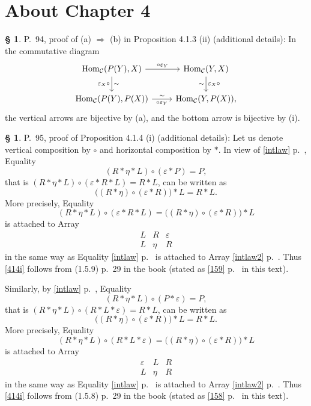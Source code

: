 \documentclass[12pt]{article}
\theoremstyle{remark}
\theoremstyle{definition}
\newtheorem{s}[thm]{\S}
\newcommand{\C}{\mathcal C}
\newcommand{\then}{\Rightarrow}
\DeclareMathOperator{\Hom}{Hom}%
\begin{document}
\section{About Chapter 4}
%
%
\begin{s} 
P.~94, proof of (a) $\then$ (b) in Proposition 4.1.3 (ii) (additional details): In the commutative diagram 
$$
\begin{tikzcd}
\Hom_\C(P(Y),X)\ar{d}{\sim}[swap]{\varepsilon_X\circ}\ar{r}{\circ\varepsilon_Y}&\Hom_\C(Y,X)\ar{d}{\varepsilon_X\circ}[swap]{\sim}\\ 
\Hom_\C(P(Y),P(X))\ar{r}[swap]{\circ\varepsilon_Y}{\sim}&\Hom_\C(Y,P(X)),
\end{tikzcd}
$$ 
the vertical arrows are bijective by (a), and the bottom arrow is bijective by (i).
\end{s}
%
%
\begin{s} 
P.~95, proof of Proposition 4.1.4 (i) (additional details): Let us denote vertical composition by $\circ$ and horizontal composition by $*$. In view of \eqref{intlaw} p.~\pageref{intlaw}, Equality 
%
\begin{equation}\label{414i}
(R*\eta*L)\circ(\varepsilon*P)=P,
\end{equation}
%
that is $(R*\eta*L)\circ(\varepsilon*R*L)=R*L$, can be written as 
$$
\Big((R*\eta)\circ(\varepsilon*R)\Big)*L=R*L.
$$ 
More precisely, Equality 
$$
(R*\eta*L)\circ(\varepsilon*R*L)=\Big((R*\eta)\circ(\varepsilon*R)\Big)*L
$$ 
is attached to Array
\begin{equation}%
\begin{matrix}
L&R&\varepsilon\\ 
L&\eta&R
\end{matrix}
\end{equation}
in the same way as Equality \eqref{intlaw} p.~\pageref{intlaw} is attached to Array \eqref{intlaw2} p.~\pageref{intlaw2}. Thus \eqref{414i} follows from (1.5.9) p.~29 in the book (stated as \eqref{159} p.~\pageref{159} in this text).

Similarly, by \eqref{intlaw} p.~\pageref{intlaw}, Equality 
%
\begin{equation}\label{414ib}
(R*\eta*L)\circ(P*\varepsilon)=P,
\end{equation}
%
that is $(R*\eta*L)\circ(R*L*\varepsilon)=R*L$, can be written as 
$$
\Big((R*\eta)\circ(\varepsilon*R)\Big)*L=R*L.
$$ 
More precisely, Equality 
$$
(R*\eta*L)\circ(R*L*\varepsilon)=\Big((R*\eta)\circ(\varepsilon*R)\Big)*L
$$ 
is attached to Array
\begin{equation}%
\begin{matrix}
\varepsilon&L&R\\ 
L&\eta&R
\end{matrix}
\end{equation}
in the same way as Equality \eqref{intlaw} p.~\pageref{intlaw} is attached to Array \eqref{intlaw2} p.~\pageref{intlaw2}. Thus \eqref{414i} follows from (1.5.8) p.~29 in the book (stated as \eqref{158} p.~\pageref{158} in this text). 
\end{s}
%
%
\end{document}
